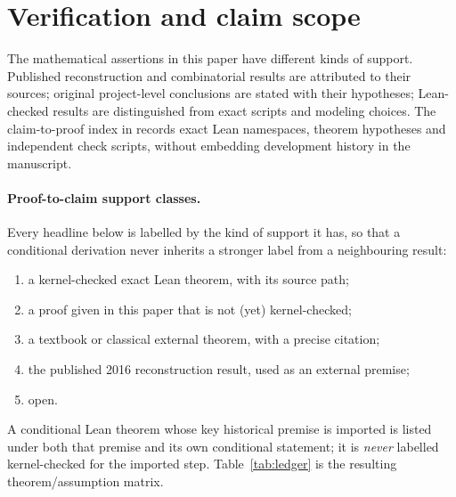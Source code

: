 \section{Verification and claim scope}
\label{app:ledger}

The mathematical assertions in this paper have different kinds of support.
Published reconstruction and combinatorial results are attributed to their
sources; original project-level conclusions are stated with their hypotheses;
Lean-checked results are distinguished from exact scripts and modeling
choices. The claim-to-proof index in  records
exact Lean namespaces, theorem hypotheses and independent check scripts,
without embedding development history in the manuscript.

\paragraph{Proof-to-claim support classes.}
Every headline below is labelled by the kind of support it has, so that a
conditional derivation never inherits a stronger label from a neighbouring
result:
\begin{enumerate}[label=\textbf{(\roman*)},leftmargin=2.2em,itemsep=1pt,topsep=2pt]
\item a kernel-checked exact Lean theorem, with its source path;
\item a proof given in this paper that is not (yet) kernel-checked;
\item a textbook or classical external theorem, with a precise citation;
\item the published 2016 reconstruction result, used as an external premise;
\item open.
\end{enumerate}
A conditional Lean theorem whose key historical premise is imported is listed
under both that premise and its own conditional statement; it is \emph{never}
labelled kernel-checked for the imported step. Table~\ref{tab:ledger} is the
resulting theorem/assumption matrix.

